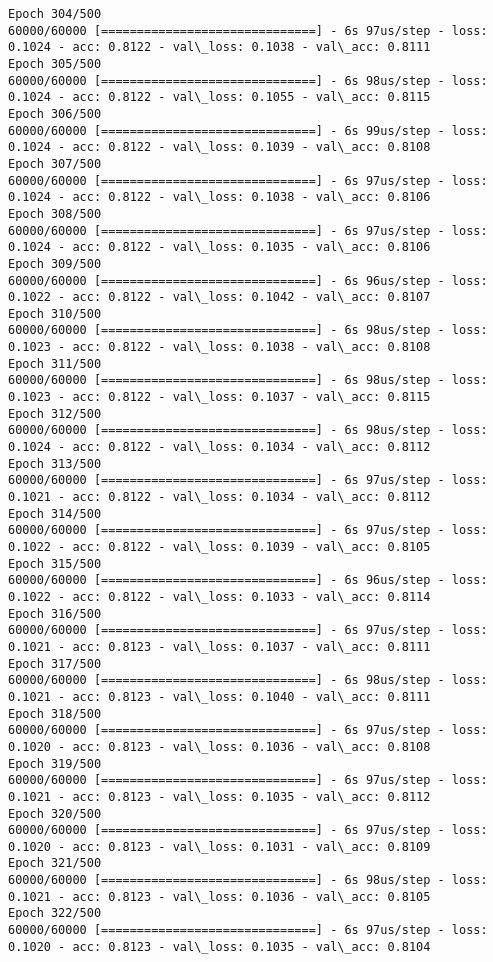 \documentclass[11pt]{article}
\begin{document}
\begin{Verbatim}[commandchars=\\\{\}]
Epoch 304/500
60000/60000 [==============================] - 6s 97us/step - loss: 0.1024 - acc: 0.8122 - val\_loss: 0.1038 - val\_acc: 0.8111
Epoch 305/500
60000/60000 [==============================] - 6s 98us/step - loss: 0.1024 - acc: 0.8122 - val\_loss: 0.1055 - val\_acc: 0.8115
Epoch 306/500
60000/60000 [==============================] - 6s 99us/step - loss: 0.1024 - acc: 0.8122 - val\_loss: 0.1039 - val\_acc: 0.8108
Epoch 307/500
60000/60000 [==============================] - 6s 97us/step - loss: 0.1024 - acc: 0.8122 - val\_loss: 0.1038 - val\_acc: 0.8106
Epoch 308/500
60000/60000 [==============================] - 6s 97us/step - loss: 0.1024 - acc: 0.8122 - val\_loss: 0.1035 - val\_acc: 0.8106
Epoch 309/500
60000/60000 [==============================] - 6s 96us/step - loss: 0.1022 - acc: 0.8122 - val\_loss: 0.1042 - val\_acc: 0.8107
Epoch 310/500
60000/60000 [==============================] - 6s 98us/step - loss: 0.1023 - acc: 0.8122 - val\_loss: 0.1038 - val\_acc: 0.8108
Epoch 311/500
60000/60000 [==============================] - 6s 98us/step - loss: 0.1023 - acc: 0.8122 - val\_loss: 0.1037 - val\_acc: 0.8115
Epoch 312/500
60000/60000 [==============================] - 6s 98us/step - loss: 0.1024 - acc: 0.8122 - val\_loss: 0.1034 - val\_acc: 0.8112
Epoch 313/500
60000/60000 [==============================] - 6s 97us/step - loss: 0.1021 - acc: 0.8122 - val\_loss: 0.1034 - val\_acc: 0.8112
Epoch 314/500
60000/60000 [==============================] - 6s 97us/step - loss: 0.1022 - acc: 0.8122 - val\_loss: 0.1039 - val\_acc: 0.8105
Epoch 315/500
60000/60000 [==============================] - 6s 96us/step - loss: 0.1022 - acc: 0.8122 - val\_loss: 0.1033 - val\_acc: 0.8114
Epoch 316/500
60000/60000 [==============================] - 6s 97us/step - loss: 0.1021 - acc: 0.8123 - val\_loss: 0.1037 - val\_acc: 0.8111
Epoch 317/500
60000/60000 [==============================] - 6s 98us/step - loss: 0.1021 - acc: 0.8123 - val\_loss: 0.1040 - val\_acc: 0.8111
Epoch 318/500
60000/60000 [==============================] - 6s 97us/step - loss: 0.1020 - acc: 0.8123 - val\_loss: 0.1036 - val\_acc: 0.8108
Epoch 319/500
60000/60000 [==============================] - 6s 97us/step - loss: 0.1021 - acc: 0.8123 - val\_loss: 0.1035 - val\_acc: 0.8112
Epoch 320/500
60000/60000 [==============================] - 6s 97us/step - loss: 0.1020 - acc: 0.8123 - val\_loss: 0.1031 - val\_acc: 0.8109
Epoch 321/500
60000/60000 [==============================] - 6s 98us/step - loss: 0.1021 - acc: 0.8123 - val\_loss: 0.1036 - val\_acc: 0.8105
Epoch 322/500
60000/60000 [==============================] - 6s 97us/step - loss: 0.1020 - acc: 0.8123 - val\_loss: 0.1035 - val\_acc: 0.8104

\end{Verbatim}
\end{document}
